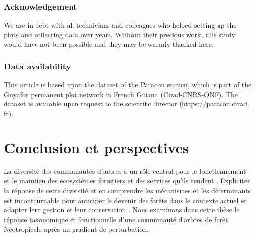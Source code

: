 \documentclass[
  11pt,
  french,
  A4paper,
  extrafontsizes,onecolumn,openright
  ]{memoir}
\begin{document}
\subsection{Acknowledgement}\label{acknowledgement-1}

We are in debt with all technicians and colleagues who helped setting up
the plots and collecting data over years. Without their precious work,
this study would have not been possible and they may be warmly thanked
here.

\subsection{Data availability}\label{data-availability-1}

This article is based upon the dataset of the Paracou station, which is
part of the Guyafor permanent plot network in French Guiana
(Cirad-CNRS-ONF). The dataset is available upon request to the
scientific director (\url{https://paracou.cirad}. fr).

\chapter{Conclusion et perspectives}\label{conclusion-et-perspectives}

La diversité des communautés d'arbres a un rôle central pour le
fonctionnement et le maintien des écosystèmes forestiers et des services
qu'ils rendent \autocite{Tilman2014}. Expliciter la réponse de cette
diversité et en comprendre les mécanismes et les déterminants est
incontournable pour anticiper le devenir des forêts dans le contexte
actuel et adapter leur gestion et leur conservation
\autocite{Barlow2018}. Nous examinons dans cette thèse la réponse
taxonomique et fonctionnelle d'une communauté d'arbres de forêt
Néotropicale après un gradient de perturbation.
\end{document}
